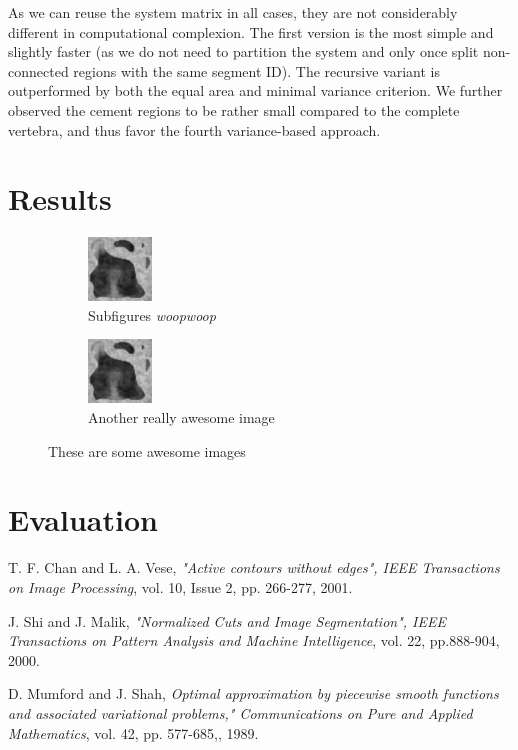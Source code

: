 \documentclass{article}
\begin{document}
  As we can reuse the system matrix in all cases, they are not considerably different in computational complexion.
  The first version is the most simple and slightly faster (as we do not need to partition the system and only once split non-connected regions with the same segment ID).
  The recursive variant is outperformed by both the equal area and minimal variance criterion.
  We further observed the cement regions to be rather small compared to the complete vertebra, and thus favor the fourth variance-based approach.
  
  \section{Results}
  {
  \begin{figure}[h]
          \centering
    \begin{subfigure}[t]{0.45\linewidth}
      \centering
      \includegraphics{test.png}
      \caption{Subfigures \textit{woopwoop}}
    \end{subfigure}
    \hfill
    \begin{subfigure}[t]{0.45\linewidth}
      \centering
      \includegraphics{test.png}
      \caption{Another really awesome image}
    \end{subfigure}
    \caption{These are some awesome images}
  \end{figure}
  }
  \pagebreak
  \section{Evaluation}
  
  
	\begin{thebibliography}{9}
	
	\bibitem{[ChanVese01]}
	T. F. Chan and L. A. Vese,
	\emph{"Active contours without edges", IEEE Transactions on Image Processing},
	vol. 10, Issue 2, pp. 266-277, 2001.
	
	
	\bibitem{[ShiMalik00]}
	J.  Shi  and  J.  Malik,
	\emph{"Normalized Cuts and Image Segmentation", IEEE Transactions on Pattern Analysis and Machine Intelligence},
	vol. 22, pp.888-904,
	2000.
	
	\bibitem{[MumfordShah89]}
	D. Mumford and J. Shah,
	\emph{Optimal approximation by piecewise smooth functions and associated
		variational problems," Communications on Pure and Applied Mathematics},
	vol. 42, pp. 577-685,,
	1989.
	
	\end{thebibliography}
\end{document}
